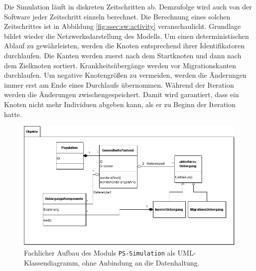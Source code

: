 Die Simulation läuft in diskreten Zeitschritten ab. Demzufolge wird auch von der Software jeder Zeitschritt einzeln berechnet. Die Berechnung eines solchen Zeitschrittes ist in Abbildung \ref{fig:ssec:sw:activity} veranschaulicht. Grundlage bildet wieder die Netzwerksdarstellung des Modells. Um einen deterministischen Ablauf zu gewährleisten, werden die Knoten entsprechend ihrer Identifikatoren durchlaufen. Die Kanten werden zuerst nach dem Startknoten und dann nach dem Zielknoten sortiert. Krankheitsübergänge werden vor Migrationskanten durchlaufen. Um negative Knotengrößen zu vermeiden, werden die Änderungen immer erst am Ende eines Durchlaufs übernommen. Während der Iteration werden die Änderungen zwischengespeichert. Damit wird garantiert, dass ein Knoten nicht mehr Individuen abgeben kann, als er zu Beginn der Iteration hatte.
\begin{figure}
\includegraphics[width=\textwidth]{res/diagramme/Analyse-Modell.png}
\caption{Fachlicher Aufbau des Moduls \texttt{PS-Simulation} als UML-Klassendiagramm, ohne Anbindung an die Datenhaltung.}\label{fig:ssec:sw:analysis}
\end{figure}
